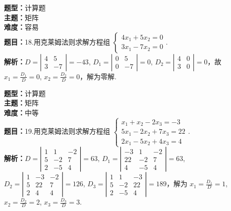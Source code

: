\documentclass{ctexart}
\newenvironment{question}[5]{%
	\noindent\textbf{题型：}#1\\
	\textbf{主题：}#2\\
	\textbf{难度：}#3\\
	\textbf{题目：}#4\\
	\textbf{解析：}#5\\
	\vspace{1em}
}{}
\begin{document}
	\begin{question}
		{计算题}
		{矩阵}
		{容易}
		{18.用克莱姆法则求解方程组 \(\left\{\begin{array}{l}4x_1+5x_2=0 \\ 3x_1-7x_2=0\end{array}\right.\). }
		{\(D=\left|\begin{array}{cc}4 & 5 \\ 3 & -7\end{array}\right|=-43\), \(D_1=\left|\begin{array}{cc}0 & 5 \\ 0 & -7\end{array}\right|=0\), \(D_2=\left|\begin{array}{cc}4 & 0 \\ 3 & 0\end{array}\right|=0\)，故 \(x_1=\frac{D_1}{D}=0\), \(x_2=\frac{D_2}{D}=0\)，解为零解. }
	\end{question}
	
	\begin{question}
		{计算题}
		{矩阵}
		{中等}
		{19.用克莱姆法则求解方程组 \(\left\{\begin{array}{l}x_1+x_2-2x_3=-3 \\ 5x_1-2x_2+7x_3=22 \\ 2x_1-5x_2+4x_3=4\end{array}\right.\). }
		{\(D=\left|\begin{array}{ccc}1 & 1 & -2 \\ 5 & -2 & 7 \\ 2 & -5 & 4\end{array}\right|=63\), \(D_1=\left|\begin{array}{ccc}-3 & 1 & -2 \\ 22 & -2 & 7 \\ 4 & -5 & 4\end{array}\right|=63\), \(D_2=\left|\begin{array}{ccc}1 & -3 & -2 \\ 5 & 22 & 7 \\ 2 & 4 & 4\end{array}\right|=126\), \(D_3=\left|\begin{array}{ccc}1 & 1 & -3 \\ 5 & -2 & 22 \\ 2 & -5 & 4\end{array}\right|=189\)，解为 \(x_1=\frac{D_1}{D}=1\), \(x_2=\frac{D_2}{D}=2\), \(x_3=\frac{D_3}{D}=3\). }
	\end{question}
	
\end{document}
